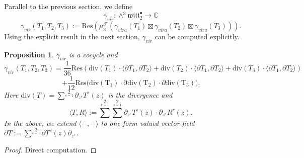 \documentclass[11pt]{amsart}
\newtheorem{prop}[thm]{Proposition}
\theoremstyle{definition}
\theoremstyle{remark}
\numberwithin{equation}{section}
\begin{document}
Parallel to the previous section, we define
$$
\gamma_{vir}:\wedge^3 \mathfrak{witt}^{\bullet}_{2}\rightarrow \mathbb{C}
$$
$$
\gamma_{vir}(T_1,T_2,T_3):=\mathrm{Res}\left(\mu^{\mathcal{F}}_3(\gamma_{vira}(T_1)\boxtimes \gamma_{vira}(T_2)\boxtimes \gamma_{vira}(T_3) )\right).
$$
Using the explicit result in the next section, $\gamma_{vir}$ can be computed explicitly.
\begin{prop}
    $\gamma_{vir}$ is a cocycle and
    $$
    \gamma_{vir}(T_1,T_2,T_3)=\frac{1}{36}\mathrm{Res}(\mathrm{div}(T_1)\cdot \langle\partial T_1,\partial T_2\rangle+\mathrm{div}(T_2)\cdot \langle\partial T_1,\partial T_2\rangle+\mathrm{div}(T_3)\cdot \langle\partial T_1,\partial T_2\rangle)
    $$
    $$
    +\frac{1}{12}\mathrm{Res(\mathrm{div(T_1)}\cdot \partial}\mathrm{div(T_2)}\cdot\partial\mathrm{div(T_3)}).
    $$
    Here $\mathrm{div}(T)=\sum^2\limits_{s=1}\partial_{z^s}T^s(z)$ is the divergence and
    $$
   \langle T,R\rangle:=\sum^2\limits_{r=1}\sum^2\limits_{s=1}\partial_{z^r} T^s(z)\cdot \partial_{z^s}R^r(z).
    $$
    In the above, we extend $\langle-,-\rangle$ to one form valued vector field $\partial T:=\sum^2\limits_{s=1}\partial T^s(z)\partial_{z^s}$.
\end{prop}
\begin{proof}
    Direct computation.
\end{proof}
\end{document}
